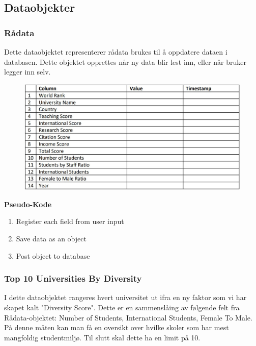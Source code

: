 \subsection{Dataobjekter}
\subsubsection{Rådata}
Dette dataobjektet representerer rådata brukes til å oppdatere dataen i databasen. Dette objektet 
opprettes når ny data blir lest inn, eller når bruker legger inn selv.

\FigureCounter
\begin{figure}[H]
  \includegraphics[width=\textwidth]{images/milepael4/rawObject.JPG}
\end{figure}

\textbf{Pseudo-Kode}
\begin{enumerate}
  \item Register each field from user input
  \item Save data as an object
  \item Post object to database
\end{enumerate}

\subsubsection{Top 10 Universities By Diversity}
I dette dataobjektet rangeres hvert universitet ut ifra en ny faktor som vi har skapet kalt "Diversity 
Score". Dette er en sammenslåing av følgende felt fra Rådata-objektet: Number of Students, 
International Students, Female To Male. På denne måten kan man få en oversikt over hvilke skoler 
som har mest mangfoldig studentmiljø. Til slutt skal dette ha en limit på 10.


